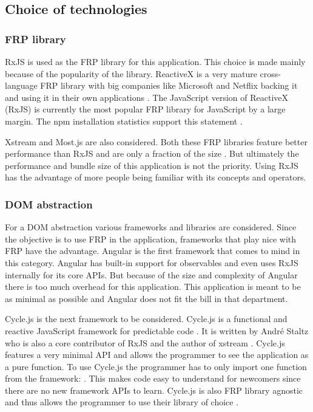 \subsection{Choice of technologies}

\subsubsection{FRP library}

RxJS is used as the FRP library for this application. This choice is made mainly because of the popularity of the library. ReactiveX is a very mature cross-language FRP library with big companies like Microsoft and Netflix backing it and using it in their own applications \cite{rx}. The JavaScript version of ReactiveX (RxJS) is currently the most popular FRP library for JavaScript by a large margin. The npm installation statistics support this statement \cite{rx-npm}\cite{most-npm}\cite{xs-npm}.

Xstream and Most.js are also considered. Both these FRP libraries feature better performance than RxJS and are only a fraction of the size \cite{rx-npm}\cite{most-npm}\cite{xs-npm}. But ultimately the performance and bundle size of this application is not the priority. Using RxJS has the advantage of more people being familiar with its concepts and operators.

\subsubsection{DOM abstraction}

For a DOM abstraction various frameworks and libraries are considered. Since the objective is to use FRP in the application, frameworks that play nice with FRP have the advantage. Angular is the first framework that comes to mind in this category. Angular has built-in support for observables and even uses RxJS internally for its core APIs. But because of the size and complexity of Angular there is too much overhead for this application. This application is meant to be as minimal as possible and Angular does not fit the bill in that department.

Cycle.js is the next framework to be considered. Cycle.js is a functional and reactive JavaScript framework for predictable code \cite{cycle}. It is written by André Staltz who is also a core contributor of RxJS and the author of xstream \cite{staltz}\cite{xs-npm}. Cycle.js features a very minimal API and allows the programmer to see the application as a pure function. To use Cycle.js the programmer has to only import one function from the framework: . This makes code easy to understand for newcomers since there are no new framework APIs to learn. Cycle.js is also FRP library agnostic and thus allows the programmer to use their library of choice \cite{cycle}.

